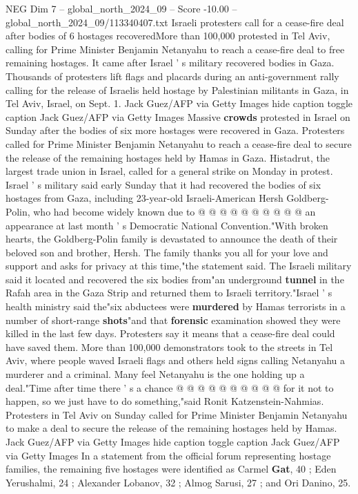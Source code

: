 \begin{textsample}{NEG Dim 7 – global\_north\_2024\_09 – Score -10.00 – global\_north\_2024\_09/113340407.txt}  \label{ex:f7_neg_018}
Israeli protesters call for a cease-fire deal after bodies of 6 hostages recoveredMore than 100,000 protested in Tel Aviv, calling for Prime Minister Benjamin Netanyahu to reach a cease-fire deal to free remaining hostages.
It came after Israel ' s military recovered bodies in Gaza.
Thousands of protesters lift flags and placards during an anti-government rally calling for the release of Israelis held hostage by Palestinian militants in Gaza, in Tel Aviv, Israel, on Sept. 1.
Jack Guez/AFP via Getty Images hide caption toggle caption Jack Guez/AFP via Getty Images Massive \textbf{crowds} protested in Israel on Sunday after the bodies of six more hostages were recovered in Gaza.
Protesters called for Prime Minister Benjamin Netanyahu to reach a cease-fire deal to secure the release of the remaining hostages held by Hamas in Gaza.
Histadrut, the largest trade union in Israel, called for a general strike on Monday in protest.
Israel ' s military said early Sunday that it had recovered the bodies of six hostages from Gaza, including 23-year-old Israeli-American Hersh Goldberg-Polin, who had become widely known due to @ @ @ @ @ @ @ @ @ @ an appearance at last month ' s Democratic National Convention."With broken hearts, the Goldberg-Polin family is devastated to announce the death of their beloved son and brother, Hersh.
The family thanks you all for your love and support and asks for privacy at this time,"the statement said.
The Israeli military said it located and recovered the six bodies from"an underground \textbf{tunnel} in the Rafah area in the Gaza Strip and returned them to Israeli territory."Israel ' s health ministry said the"six abductees were \textbf{murdered} by Hamas terrorists in a number of short-range \textbf{shots}"and that \textbf{forensic} examination showed they were killed in the last few days.
Protesters say it means that a cease-fire deal could have saved them.
More than 100,000 demonstrators took to the streets in Tel Aviv, where people waved Israeli flags and others held signs calling Netanyahu a murderer and a criminal.
Many feel Netanyahu is the one holding up a deal."Time after time there ' s a chance @ @ @ @ @ @ @ @ @ @ for it not to happen, so we just have to do something,"said Ronit Katzenstein-Nahmias.
Protesters in Tel Aviv on Sunday called for Prime Minister Benjamin Netanyahu to make a deal to secure the release of the remaining hostages held by Hamas.
Jack Guez/AFP via Getty Images hide caption toggle caption Jack Guez/AFP via Getty Images In a statement from the official forum representing hostage families, the remaining five hostages were identified as Carmel \textbf{Gat}, 40 ; Eden Yerushalmi, 24 ; Alexander Lobanov, 32 ; Almog Sarusi, 27 ; and Ori Danino, 25.

\end{textsample}
